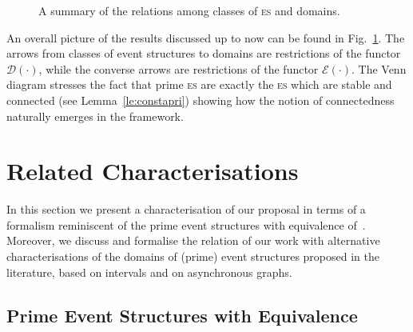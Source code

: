 \documentclass[conference]{IEEEtran}
\newcommand{\esabbr}{\textsc{es}}
\newcommand{\WDom}{\ensuremath{\mathsf{wDom}}}
\newcommand{\PDom}{\ensuremath{\mathsf{pDom}}}
\newcommand{\zev}[0]{\ensuremath{\mathcal{E}}}
\newcommand{\ev}[1]{\ensuremath{\zev({#1})}}
\newcommand{\zdom}[0]{\ensuremath{\mathcal{D}}}
\newcommand{\dom}[1]{\ensuremath{\zdom({#1})}}
\begin{document}
\begin{figure}
{
}


\caption{A summary of the relations among classes of {\esabbr} and domains.}
\label{fi:summary}
\end{figure}
 
An overall picture of the results discussed up to now can be found in Fig.~\ref{fi:summary}. The arrows from classes of event structures to domains are restrictions of the functor $\dom{\cdot}$, while the converse arrows are restrictions of the functor  $\ev{\cdot}$. The Venn diagram stresses the fact that prime {\esabbr} are exactly the {\esabbr} which are stable and connected (see Lemma~\ref{le:constapri}) showing how the notion of connectedness naturally emerges in the framework.




\section{Related Characterisations}
\label{se:characterisations}

In this section we present a characterisation of our proposal in terms
of a formalism reminiscent of the prime event structures with
equivalence of~\cite{win2017,VismeW19}. Moreover, we discuss and
formalise the relation of our work with alternative characterisations
of the domains of (prime) event structures proposed in the literature,
based on intervals and on asynchronous graphs.


\subsection{Prime Event Structures with Equivalence}
\label{ss:pes-equiv}
\end{document}
